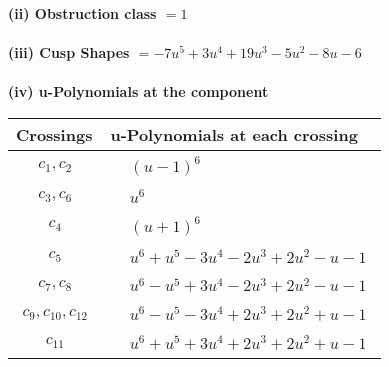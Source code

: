 \documentclass[1p]{elsarticle_modified}
\theoremstyle{definition}
\begin{document}
\flushleft \textbf{(ii) Obstruction class $= 1$}\\~\\
\flushleft \textbf{(iii) Cusp Shapes $= -7 u^5+3 u^4+19 u^3-5 u^2-8 u-6$}\\~\\
\newpage\renewcommand{\arraystretch}{1}
\flushleft \textbf{(iv) u-Polynomials at the component}\newline \\
\begin{tabular}{m{50pt}|m{274pt}}
Crossings & \hspace{64pt}u-Polynomials at each crossing \\
\hline $$\begin{aligned}c_{1},c_{2}\end{aligned}$$&$\begin{aligned}
&(u-1)^6
\end{aligned}$\\
\hline $$\begin{aligned}c_{3},c_{6}\end{aligned}$$&$\begin{aligned}
&u^6
\end{aligned}$\\
\hline $$\begin{aligned}c_{4}\end{aligned}$$&$\begin{aligned}
&(u+1)^6
\end{aligned}$\\
\hline $$\begin{aligned}c_{5}\end{aligned}$$&$\begin{aligned}
&u^6+u^5-3 u^4-2 u^3+2 u^2- u-1
\end{aligned}$\\
\hline $$\begin{aligned}c_{7},c_{8}\end{aligned}$$&$\begin{aligned}
&u^6- u^5+3 u^4-2 u^3+2 u^2- u-1
\end{aligned}$\\
\hline $$\begin{aligned}c_{9},c_{10},c_{12}\end{aligned}$$&$\begin{aligned}
&u^6- u^5-3 u^4+2 u^3+2 u^2+u-1
\end{aligned}$\\
\hline $$\begin{aligned}c_{11}\end{aligned}$$&$\begin{aligned}
&u^6+u^5+3 u^4+2 u^3+2 u^2+u-1
\end{aligned}$\\
\hline
\end{tabular}\\~\\
\end{document}

